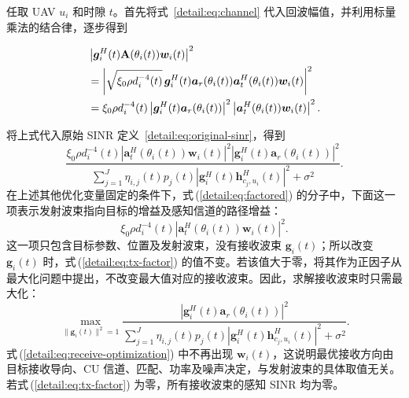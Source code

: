 \documentclass[11pt,a4paper]{ctexart}
\begin{document}
任取 UAV $u_i$ 和时隙 $t$。首先将式~\eqref{detail:eq:channel} 代入回波幅值，并利用标量乘法的结合律，逐步得到
\begin{samepage}
\begin{align}
&\left|\bm g_i^H(t)\mathbf A(\theta_i(t))\bm w_i(t)\right|^2\notag\\
&=\left|\sqrt{\xi_0\rho d_i^{-4}(t)}\,
\bm g_i^H(t)\bm a_r(\theta_i(t))\bm a_t^H(\theta_i(t))\bm w_i(t)\right|^2\notag\\
&=\xi_0\rho d_i^{-4}(t)
\left|\bm g_i^H(t)\bm a_r(\theta_i(t))\right|^2
\left|\bm a_t^H(\theta_i(t))\bm w_i(t)\right|^2.\label{detail:eq:factor}
\end{align}
\end{samepage}
将上式代入原始 SINR 定义~\eqref{detail:eq:original-sinr}，得到
\begin{equation}\label{detail:eq:factored}
\frac{\xi_0\rho d_i^{-4}(t)
\left|\bm a_t^H(\theta_i(t))\bm w_i(t)\right|^2
\left|\bm g_i^H(t)\bm a_r(\theta_i(t))\right|^2}
{\displaystyle\sum_{j=1}^J\eta_{i,j}(t)p_j(t)
\left|\bm g_i^H(t)\bm h_{c_j,u_i}^{H}(t)\right|^2+\sigma^2}.
\end{equation}
在上述其他优化变量固定的条件下，式\,(\ref{detail:eq:factored}) 的分子中，下面这一项表示发射波束指向目标的增益及感知信道的路径增益：
\begin{equation}\label{detail:eq:tx-factor}
\xi_0\rho d_i^{-4}(t)
\left|\bm a_t^H(\theta_i(t))\bm w_i(t)\right|^2.
\end{equation}
这一项只包含目标参数、位置及发射波束，没有接收波束 $\bm g_i(t)$；所以改变 $\bm g_i(t)$ 时，式\,(\ref{detail:eq:tx-factor}) 的值不变。若该值大于零，将其作为正因子从最大化问题中提出，不改变最大值对应的接收波束。因此，求解接收波束时只需最大化：
\begin{equation}\label{detail:eq:receive-optimization}
\max_{\|\bm g_i(t)\|^2=1}
\frac{\left|\bm g_i^H(t)\bm a_r(\theta_i(t))\right|^2}
{\displaystyle\sum_{j=1}^J\eta_{i,j}(t)p_j(t)
\left|\bm g_i^H(t)\bm h_{c_j,u_i}^{H}(t)\right|^2+\sigma^2}.
\end{equation}
式\,(\ref{detail:eq:receive-optimization}) 中不再出现 $\bm w_i(t)$，这说明最优接收方向由目标接收导向、CU 信道、匹配、功率及噪声决定，与发射波束的具体取值无关。若式\,(\ref{detail:eq:tx-factor}) 为零，所有接收波束的感知 SINR 均为零。
\end{document}
